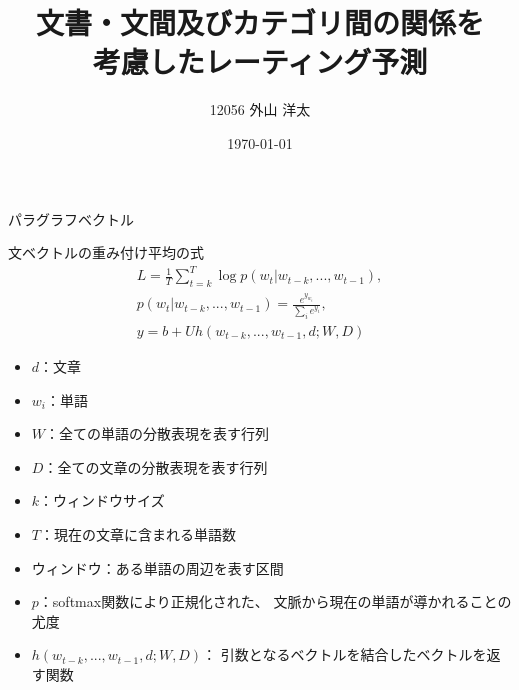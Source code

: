 \documentclass[aspectratio=43,unicode,10pt]{beamer}
\title{文書・文間及びカテゴリ間の関係を\\考慮したレーティング予測}
\institute{知能数理研究室}
\author{12056 外山 洋太}
\date{\today}
\begin{document}
\begin{frame}{パラグラフベクトル}{}
\end{frame}

\begin{frame}{文ベクトルの重み付け平均の式}{}
  \begin{gather*}
    L = \frac{1}{T} \sum^{T}_{t = k} \log p(w_t | w_{t-k}, ..., w_{t-1}),
      \label{eq:ParagraphVector} \\
    p(w_t | w_{t-k}, ..., w_{t-1}) = \frac{e^{y_{w_t}}}{\sum_i e^{y_i}},
      \nonumber \\
    y = b + Uh(w_{t-k}, ..., w_{t-1}, d; W, D) \nonumber
  \end{gather*}
  \begin{itemize}
    \footnotesize
    \item $d$：文章
    \item $w_i$：単語
    \item $W$：全ての単語の分散表現を表す行列
    \item $D$：全ての文章の分散表現を表す行列
    \item $k$：ウィンドウサイズ
    \item $T$：現在の文章に含まれる単語数
    \item ウィンドウ：ある単語の周辺を表す区間
    \item $p$：softmax関数により正規化された、
          文脈から現在の単語が導かれることの尤度
    \item $h(w_{t-k}, ..., w_{t-1}, d; W, D)$：
          引数となるベクトルを結合したベクトルを返す関数
  \end{itemize}
\end{frame}
\end{document}
